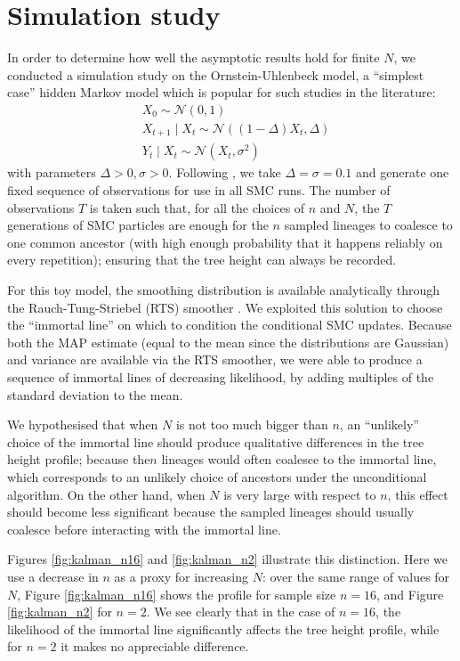 \documentclass{article}
\newcommand{\N}{\mathcal{N}}
\begin{document}
\section{Simulation study}
In order to determine how well the asymptotic results hold for finite $N$, we conducted a simulation study on the Ornstein-Uhlenbeck model, a ``simplest case'' hidden Markov model which is popular for such studies in the literature:
\begin{align*}
& X_0 \sim \N(0,1) \\
& X_{t+1} \mid X_t \sim \N((1-\Delta)X_t, \Delta) \\
& Y_t \mid X_{t} \sim \N(X_t, \sigma^2)
\end{align*}
with parameters $\Delta >0, \sigma >0$. 
Following \citet{koskela2018}, we take $\Delta = \sigma = 0.1$ and generate one fixed sequence of observations for use in all SMC runs.
The number of observations $T$ is taken such that, for all the choices of $n$ and $N$, the $T$ generations of SMC particles are enough for the $n$ sampled lineages to coalesce to one common ancestor (with high enough probability that it happens reliably on every repetition); ensuring that the tree height can always be recorded.

For this toy model, the smoothing distribution is available analytically through the Rauch-Tung-Striebel (RTS) smoother \citep{rauch1965}. We exploited this solution to choose the ``immortal line'' on which to condition the conditional SMC updates. Because both the MAP estimate (equal to the mean since the distributions are Gaussian) and variance are available via the RTS smoother, we were able to produce a sequence of immortal lines of decreasing likelihood, by adding multiples of the standard deviation to the mean.

We hypothesised that when $N$ is not too much bigger than $n$, an ``unlikely'' choice of the immortal line should produce qualitative differences in the tree height profile; because the$n$ lineages would often coalesce to the immortal line, which corresponds to an unlikely choice of ancestors under the unconditional algorithm. On the other hand, when $N$ is very large with respect to $n$, this effect should become less significant because the sampled lineages should usually coalesce before interacting with the immortal line.

Figures \ref{fig:kalman_n16} and \ref{fig:kalman_n2} illustrate this distinction. Here we use a decrease in $n$ as a proxy for increasing $N$: over the same range of values for $N$, Figure \ref{fig:kalman_n16} shows the profile for sample size $n=16$, and Figure \ref{fig:kalman_n2} for $n=2$.
We see clearly that in the case of $n=16$, the likelihood of the immortal line significantly affects the tree height profile, while for $n=2$ it makes no appreciable difference.
\end{document}
